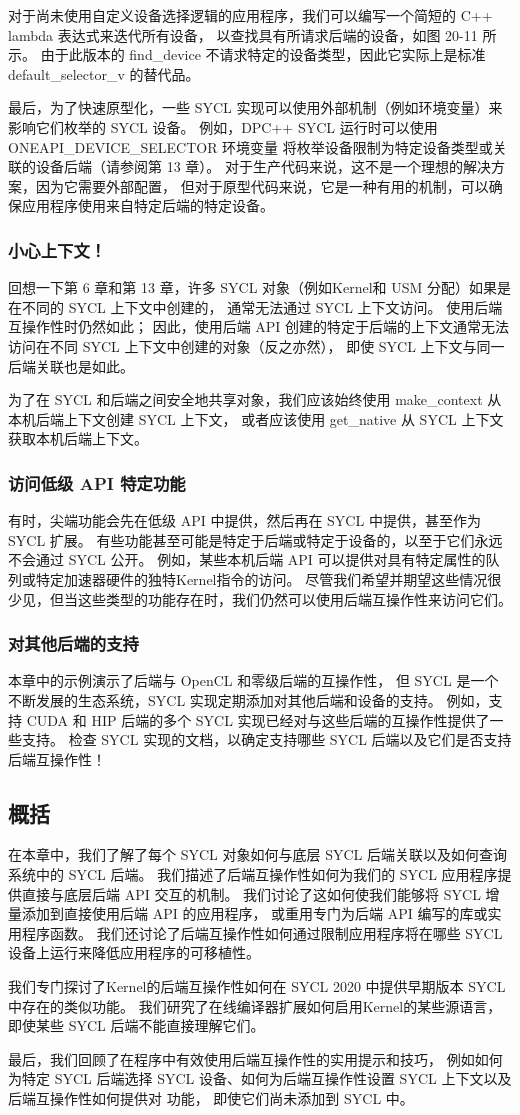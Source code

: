 对于尚未使用自定义设备选择逻辑的应用程序，我们可以编写一个简短的 C++ lambda 表达式来迭代所有设备，
以查找具有所请求后端的设备，如图 20-11 所示。 
由于此版本的 find\_device 不请求特定的设备类型，因此它实际上是标准 default\_selector\_v 的替代品。

最后，为了快速原型化，一些 SYCL 实现可以使用外部机制（例如环境变量）来影响它们枚举的 SYCL 设备。 
例如，DPC++ SYCL 运行时可以使用 ONEAPI\_DEVICE\_SELECTOR 环境变量
将枚举设备限制为特定设备类型或关联的设备后端（请参阅第 13 章）。 
对于生产代码来说，这不是一个理想的解决方案，因为它需要外部配置，
但对于原型代码来说，它是一种有用的机制，可以确保应用程序使用来自特定后端的特定设备。

\subsubsection{小心上下文！}
回想一下第 6 章和第 13 章，许多 SYCL 对象（例如Kernel和 USM 分配）如果是在不同的 SYCL 上下文中创建的，
通常无法通过 SYCL 上下文访问。 使用后端互操作性时仍然如此； 
因此，使用后端 API 创建的特定于后端的上下文通常无法访问在不同 SYCL 上下文中创建的对象（反之亦然），
即使 SYCL 上下文与同一后端关联也是如此。

为了在 SYCL 和后端之间安全地共享对象，我们应该始终使用 make\_context 从本机后端上下文创建 SYCL 上下文，
或者应该使用 get\_native 从 SYCL 上下文获取本机后端上下文。

\subsubsection{访问低级 API 特定功能}
有时，尖端功能会先在低级 API 中提供，然后再在 SYCL 中提供，甚至作为 SYCL 扩展。 
有些功能甚至可能是特定于后端或特定于设备的，以至于它们永远不会通过 SYCL 公开。 
例如，某些本机后端 API 可以提供对具有特定属性的队列或特定加速器硬件的独特Kernel指令的访问。 
尽管我们希望并期望这些情况很少见，但当这些类型的功能存在时，我们仍然可以使用后端互操作性来访问它们。

\subsubsection{对其他后端的支持}
本章中的示例演示了后端与 OpenCL 和零级后端的互操作性，
但 SYCL 是一个不断发展的生态系统，SYCL 实现定期添加对其他后端和设备的支持。 
例如，支持 CUDA 和 HIP 后端的多个 SYCL 实现已经对与这些后端的互操作性提供了一些支持。 
检查 SYCL 实现的文档，以确定支持哪些 SYCL 后端以及它们是否支持后端互操作性！

\subsection{概括}
在本章中，我们了解了每个 SYCL 对象如何与底层 SYCL 后端关联以及如何查询系统中的 SYCL 后端。 
我们描述了后端互操作性如何为我们的 SYCL 应用程序提供直接与底层后端 API 交互的机制。 
我们讨论了这如何使我们能够将 SYCL 增量添加到直接使用后端 API 的应用程序，
或重用专门为后端 API 编写的库或实用程序函数。 
我们还讨论了后端互操作性如何通过限制应用程序将在哪些 SYCL 设备上运行来降低应用程序的可移植性。

我们专门探讨了Kernel的后端互操作性如何在 SYCL 2020 中提供早期版本 SYCL 中存在的类似功能。 
我们研究了在线编译器扩展如何启用Kernel的某些源语言，即使某些 SYCL 后端不能直接理解它们。

最后，我们回顾了在程序中有效使用后端互操作性的实用提示和技巧，
例如如何为特定 SYCL 后端选择 SYCL 设备、如何为后端互操作性设置 SYCL 上下文以及后端互操作性如何提供对 功能，
即使它们尚未添加到 SYCL 中。
